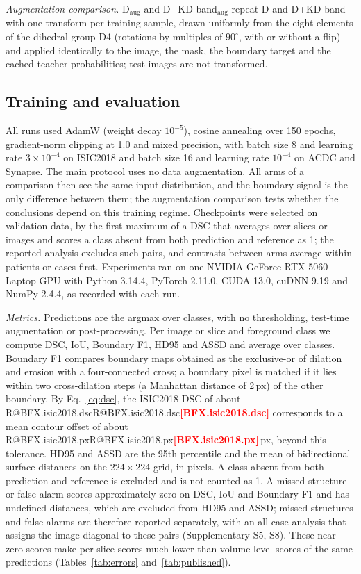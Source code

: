 \documentclass[fleqn,10pt,lineno]{wlpeerj}
\makeatletter
\newcommand{\R}[1]{\ifcsname R@#1\endcsname\csname R@#1\endcsname\else\textbf{\textcolor{red}{[#1]}}\fi}
\makeatother
\begin{document}
\emph{Augmentation comparison.} D$_{\mathrm{aug}}$ and D+KD-band$_{\mathrm{aug}}$ repeat D and D+KD-band with one transform per training sample, drawn uniformly from the eight elements of the dihedral group D4 (rotations by multiples of $90^{\circ}$, with or without a flip) and applied identically to the image, the mask, the boundary target and the cached teacher probabilities; test images are not transformed.

\subsection*{Training and evaluation}
All runs used AdamW (weight decay $10^{-5}$), cosine annealing over 150 epochs, gradient-norm clipping at 1.0 and mixed precision, with batch size 8 and learning rate $3\times10^{-4}$ on ISIC2018 and batch size 16 and learning rate $10^{-4}$ on ACDC and Synapse. The main protocol uses no data augmentation. All arms of a comparison then see the same input distribution, and the boundary signal is the only difference between them; the augmentation comparison tests whether the conclusions depend on this training regime. Checkpoints were selected on validation data, by the first maximum of a DSC that averages over slices or images and scores a class absent from both prediction and reference as 1; the reported analysis excludes such pairs, and contrasts between arms average within patients or cases first. Experiments ran on one NVIDIA GeForce RTX 5060 Laptop GPU with Python 3.14.4, PyTorch 2.11.0, CUDA 13.0, cuDNN 9.19 and NumPy 2.4.4, as recorded with each run.

\emph{Metrics.} Predictions are the argmax over classes, with no thresholding, test-time augmentation or post-processing. Per image or slice and foreground class we compute DSC, IoU, Boundary F1, HD95 and ASSD and average over classes. Boundary F1 compares boundary maps obtained as the exclusive-or of dilation and erosion with a four-connected cross; a boundary pixel is matched if it lies within two cross-dilation steps (a Manhattan distance of 2\,px) of the other boundary. By Eq.~\ref{eq:dsc}, the ISIC2018 DSC of about \R{BFX.isic2018.dsc} corresponds to a mean contour offset of about \R{BFX.isic2018.px}\,px, beyond this tolerance. HD95 and ASSD are the 95th percentile and the mean of bidirectional surface distances on the $224\times224$ grid, in pixels. A class absent from both prediction and reference is excluded and is not counted as 1. A missed structure or false alarm scores approximately zero on DSC, IoU and Boundary F1 and has undefined distances, which are excluded from HD95 and ASSD; missed structures and false alarms are therefore reported separately, with an all-case analysis that assigns the image diagonal to these pairs (Supplementary S5, S8). These near-zero scores make per-slice scores much lower than volume-level scores of the same predictions (Tables~\ref{tab:errors} and~\ref{tab:published}).
\end{document}
